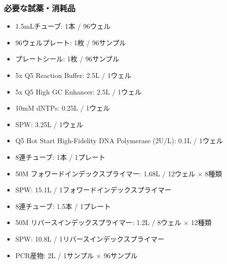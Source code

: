 \documentclass[titlepage,10pt,a4paper,uplatex]{jsbook}
\begin{document}
\subsubsection{必要な試薬・消耗品}
\begin{itemize}
\item 1.5mLチューブ: 1本 / 96ウェル
\item 96ウェルプレート: 1枚 / 96サンプル
\item プレートシール: 1枚 / 96サンプル
\item 5x Q5 Reaction Buffer: 2.5{\textmu}L / 1ウェル
\item 5x Q5 High GC Enhancer: 2.5{\textmu}L / 1ウェル
\item 10mM dNTPs: 0.25{\textmu}L / 1ウェル
\item SPW: 3.25{\textmu}L / 1ウェル
\item Q5 Hot Start High-Fidelity DNA Polymerase (2U/{\textmu}L): 0.1{\textmu}L / 1ウェル
\item 8連チューブ: 1本 / 1プレート
\item 50{\textmu}M フォワードインデックスプライマー: 1.68{\textmu}L / 12ウェル × 8種類
\item SPW: 15.1{\textmu}L / 1フォワードインデックスプライマー
\item 8連チューブ: 1.5本 / 1プレート
\item 50{\textmu}M リバースインデックスプライマー: 1.2{\textmu}L / 8ウェル × 12種類
\item SPW: 10.8{\textmu}L / 1リバースインデックスプライマー
\item PCR産物: 2{\textmu}L / 1サンプル × 96サンプル
\end{itemize}
\end{document}
